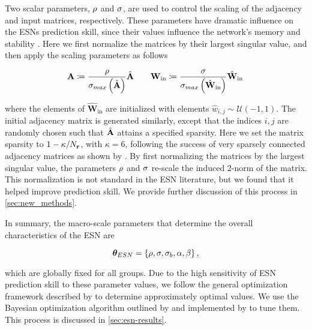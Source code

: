 Two scalar parameters, $\rho$ and $\sigma$,
are used to control the scaling of the adjacency and input matrices,
respectively.
These parameters have dramatic influence on the ESNs prediction skill, since their
values influence the network's memory and stability
\citep{lukosevicius_practical_2012,hermans_memory_2010}.
Here we first normalize the matrices by their largest singular value, and then
apply the scaling parameters as follows
\begin{linenomath*}\begin{equation*}
    \mathbf{A} \coloneqq
    \dfrac{\rho}{\sigma_{max}\left(\hat{\mathbf{A}}\right)}
    \hat{\mathbf{A}}
    \qquad
    \mathbf{W}_\text{in} \coloneqq
    \dfrac{\sigma}{\sigma_{max}\left(\hat{\mathbf{W}}_\text{in}\right)}
    \hat{\mathbf{W}}_\text{in} \,
\end{equation*}\end{linenomath*}
where the elements of $\hat{\mathbf{W}}_\text{in}$
are initialized with elements $\hat{w}_{i,j}\sim\mathcal{U}(-1,1)$.
The initial adjacency matrix is generated similarly, except that the indices
$i,j$ are randomly chosen such that $\hat{\mathbf{A}}$ attains a specified
sparsity.
Here we set the matrix sparsity to $1 - \kappa / N_{\mathbf{r}}$, with $\kappa=6$,
following the success of very sparsely connected adjacency matrices as shown by
\citet{griffith_forecasting_2019}.
By first normalizing the matrices by the largest singular value, the parameters
$\rho$ and $\sigma$ re-scale the induced 2-norm of
the matrix.
This normalization is not standard in the ESN literature, but we found that it
helped improve prediction skill.
We provide further discussion of this process in \cref{sec:new_methods}.

In summary, the macro-scale parameters that determine the overall
characteristics of the ESN are

\begin{linenomath*}\begin{equation}
    \bm{\theta}_{ESN} =
    \{ \rho, \sigma, \sigma_{b}, \alpha, \beta \} \,
    ,
    \label{eq:rc-hyperparameters}
\end{equation}\end{linenomath*}
which are globally fixed for all groups.
Due to the high sensitivity of ESN prediction skill to these parameter values,
we follow the general optimization framework described by
\citet{platt_systematic_2022} to determine approximately optimal values.
We use the Bayesian optimization algorithm outlined by
\citet{jones_efficient_1998} and implemented by \citet{bouhlel_python_2019} to tune them.
This process is discussed in \cref{sec:esn-results}.
